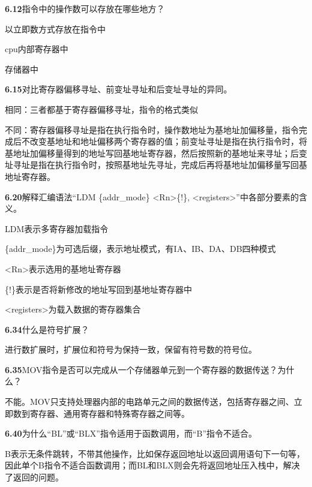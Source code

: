 \documentclass{article}
\begin{document}
    \noindent\textbf{6.12}指令中的操作数可以存放在哪些地方？\par
     以立即数方式存放在指令中\par
     cpu内部寄存器中\par
     存储器中
    \\[4pt]\par

    \noindent\textbf{6.15}对比寄存器偏移寻址、前变址寻址和后变址寻址的异同。\par
    相同：三者都基于寄存器偏移寻址，指令的格式类似\par
    不同：寄存器偏移寻址是指在执行指令时，操作数地址为基地址加偏移量，指令完成后不改变基地址和地址偏移两个寄存器的值；前变址寻址是指在执行指令时，将基地址加偏移量得到的地址写回基地址寄存器，然后按照新的基地址来寻址；后变址寻址是指在执行指令时，按照基地址先寻址，完成后再将基地址加偏移量写回基地址寄存器。
    \\[4pt]\par

    \noindent\textbf{6.20}解释汇编语法“LDM \{addr\_mode\} <Rn>\{!\}, <registers>”中各部分要素的含义。\par
     LDM表示多寄存器加载指令\par
     \{addr\_mode\}为可选后缀，表示地址模式，有IA、IB、DA、DB四种模式\par
     <Rn>表示选用的基地址寄存器\par
     \{!\}表示是否将新修改的地址写回到基地址寄存器中\par
     <registers>为载入数据的寄存器集合
    \\[4pt]\par

    \noindent\textbf{6.34}什么是符号扩展？\par
    进行数扩展时，扩展位和符号为保持一致，保留有符号数的符号位。
    \\[4pt]\par

    \noindent\textbf{6.35}MOV指令是否可以完成从一个存储器单元到一个寄存器的数据传送？为什么？\par
    不能。MOV只支持处理器内部的电路单元之间的数据传送，包括寄存器之间、立即数到寄存器、通用寄存器和特殊寄存器之间等。
    \\[4pt]\par

    \noindent\textbf{6.40}为什么“BL”或“BLX”指令适用于函数调用，而“B”指令不适合。\par
    B表示无条件跳转，不带其他操作，比如保存返回地址以返回调用语句下一句等，因此单个B指令不适合函数调用；而BL和BLX则会先将返回地址压入栈中，解决了返回的问题。
    \\[4pt]\par
\end{document}
